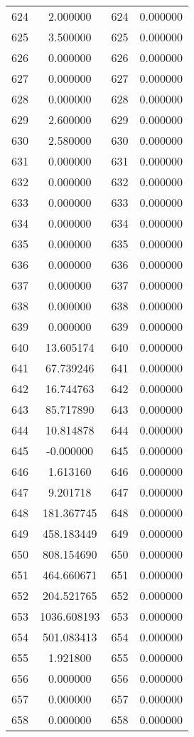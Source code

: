 \documentclass[12pt]{article}
\begin{document}
\begin{longtable}{@{}cccc@{}}
624 & 2.000000 & 624 & 0.000000 \\
625 & 3.500000 & 625 & 0.000000 \\
626 & 0.000000 & 626 & 0.000000 \\
627 & 0.000000 & 627 & 0.000000 \\
628 & 0.000000 & 628 & 0.000000 \\
629 & 2.600000 & 629 & 0.000000 \\
630 & 2.580000 & 630 & 0.000000 \\
631 & 0.000000 & 631 & 0.000000 \\
632 & 0.000000 & 632 & 0.000000 \\
633 & 0.000000 & 633 & 0.000000 \\
634 & 0.000000 & 634 & 0.000000 \\
635 & 0.000000 & 635 & 0.000000 \\
636 & 0.000000 & 636 & 0.000000 \\
637 & 0.000000 & 637 & 0.000000 \\
638 & 0.000000 & 638 & 0.000000 \\
639 & 0.000000 & 639 & 0.000000 \\
640 & 13.605174 & 640 & 0.000000 \\
641 & 67.739246 & 641 & 0.000000 \\
642 & 16.744763 & 642 & 0.000000 \\
643 & 85.717890 & 643 & 0.000000 \\
644 & 10.814878 & 644 & 0.000000 \\
645 & -0.000000 & 645 & 0.000000 \\
646 & 1.613160 & 646 & 0.000000 \\
647 & 9.201718 & 647 & 0.000000 \\
648 & 181.367745 & 648 & 0.000000 \\
649 & 458.183449 & 649 & 0.000000 \\
650 & 808.154690 & 650 & 0.000000 \\
651 & 464.660671 & 651 & 0.000000 \\
652 & 204.521765 & 652 & 0.000000 \\
653 & 1036.608193 & 653 & 0.000000 \\
654 & 501.083413 & 654 & 0.000000 \\
655 & 1.921800 & 655 & 0.000000 \\
656 & 0.000000 & 656 & 0.000000 \\
657 & 0.000000 & 657 & 0.000000 \\
658 & 0.000000 & 658 & 0.000000 \\

\end{longtable}
\end{document}
